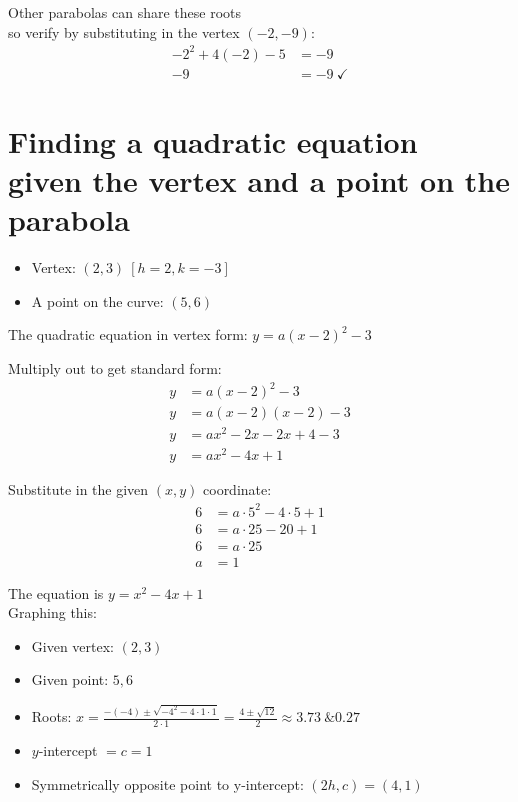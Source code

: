 \documentclass[12pt]{article}
\begin{document}
\noindent
Other parabolas can share these roots\\so verify by substituting in the vertex $(-2,-9)$:
\begin{align*}
-2^2+4(-2)-5&=-9\\
-9&=-9 \ \checkmark
\end{align*}

\section*{Finding a quadratic equation\\given the vertex and a point on the parabola}

\begin{itemize}
\item Vertex: $(2,3) \ [h=2,k=-3]$
\item A point on the curve: $(5,6)$
\end{itemize}

The quadratic equation in vertex form: $y=a(x-2)^2-3$

Multiply out to get standard form: 
\begin{align*}
y&=a(x-2)^2-3\\
y&=a(x-2)(x-2)-3\\
y&=ax^2-2x-2x+4-3\\
y&=ax^2-4x+1
\end{align*}

Substitute in the given $(x,y)$ coordinate:
\begin{align*}
6&=a\cdot5^2-4\cdot5+1\\
6&=a\cdot25-20+1\\
6&=a\cdot25\\
a&=1
\end{align*}

The equation is $y=x^2-4x+1$\\

Graphing this:

\begin{itemize}
\item Given vertex: $(2,3)$
\item Given point: $5,6$
\item Roots: $x = \frac{-(-4)\pm\sqrt{-4^2-4\cdot1\cdot1}}{2\cdot1} = \frac{4\pm\sqrt{12}}{2} \approx 3.73 \ \& 0.27$
\item $y$-intercept $= c = 1$
\item Symmetrically opposite point to y-intercept: $(2h,c) = (4,1)$
\end{itemize}
\end{document}
